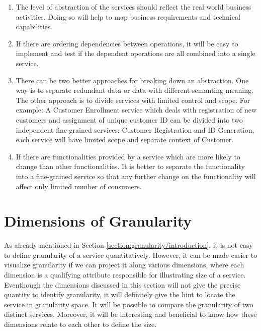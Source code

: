 \begin{enumerate}
\item The level of abstraction of the services should reflect the real world business activities. Doing so will help to map business requirements and technical capabilities. \cite{Pierre-Reldin:2007aa}

\item If there are ordering dependencies between operations, it will be easy to implement and test if the dependent operations are all combined into a single service. \cite{Bianco:2007aa}

\item There can be two better approaches for breaking down an abstraction. One way is to separate redundant data or data with different semanting meaning. The other approach is to divide services with limited control and scope. For example: A Customer Enrollment service which deals with registration of new customers and assignment of unique customer ID can be divided into two independent fine-grained services: Customer Registration and ID Generation, each service will have limited scope and separate context of Customer.\cite{Pierre-Reldin:2007aa}

\item If there are functionalities provided by a service which are more likely to change than other functionalities. It is better to separate the functionality into a fine-grained service so that any further change on the functionality will affect only limited number of consumers. \cite{Bianco:2007aa}
 
\end{enumerate}

\section{Dimensions of Granularity}\label{section:granularity/dimensions}
As already mentioned in Section \ref{section:granularity/introduction}, it is not easy to define granularity of a service quantitatively. However, it can be made easier to visualize granularity if we can project it along various dimensions, where each dimension is a qualifying attribute responsible for illustrating size of a service. Eventhough the  dimensions discussed in this section will not give the precise quantity to identify granularity, it will definitely give the hint to locate the service in granularity space. It will be possible to compare the granularity of two distinct services. Moreover, it will be interesting and beneficial to know how these dimensions relate to each other to define the size.

